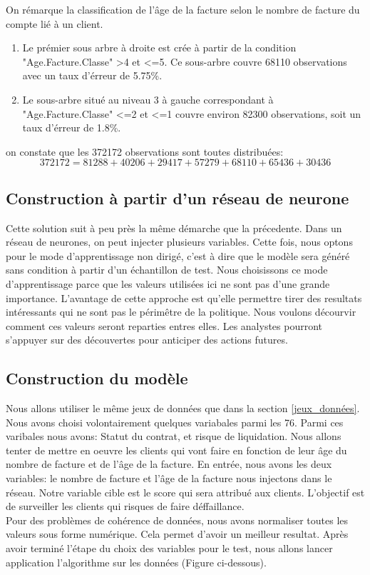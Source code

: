 \documentclass[11pt,a4paper]{report}
\begin{document}
\newpage
On rémarque la classification de l'âge de la facture selon le nombre de facture du compte lié à un client. 
\begin{enumerate}
\item Le prémier sous arbre  à droite est crée à partir de la condition "Age.Facture.Classe" >4 et <=5. Ce sous-arbre couvre 68110 observations avec un taux d'érreur de 5.75\%.

\item Le sous-arbre situé au niveau 3 à gauche correspondant à "Age.Facture.Classe" <=2 et <=1 couvre environ 82300 observations, soit un taux d'érreur de 1.8\%.
\end{enumerate}

on constate que les 372172 observations sont toutes distribuées:
\begin{equation}
          372172=81288+40206+29417+57279+68110+65436+30436
\end{equation}

\newpage
\subsection{Construction à partir d'un réseau de neurone}
Cette solution suit à peu près la même démarche que la précedente. Dans un réseau de neurones, on peut injecter plusieurs variables. Cette fois, nous optons pour le mode d'apprentissage non dirigé, c'est à dire que le modèle sera généré sans condition à partir d'un échantillon de test. Nous choisissons ce mode d'apprentissage parce que les valeurs utilisées ici ne sont pas d'une grande importance. L'avantage de cette approche est qu'elle permettre tirer des resultats intéressants qui ne sont pas le périmêtre de la politique. Nous voulons décourvir comment ces valeurs seront reparties entres elles. Les analystes pourront s'appuyer sur des découvertes pour anticiper des actions futures.     
 
\subsection{Construction du modèle} \label{page}
Nous allons utiliser le même jeux de données que dans la section \ref{jeux_données}. Nous avons choisi volontairement quelques variabales parmi les 76. Parmi ces varibales nous avons: Statut du contrat, et risque de liquidation. Nous allons tenter de mettre en oeuvre les clients qui vont faire en fonction de leur âge du nombre de facture et de l'âge de la facture. 
En entrée, nous avons les deux variables: le nombre de facture et l'âge de la facture nous injectons dans le réseau. Notre variable cible est le score qui sera attribué aux clients. L'objectif est de surveiller les clients qui risques de faire déffaillance.\\
Pour des problèmes de cohérence de données, nous avons normaliser toutes les valeurs sous forme numérique. Cela permet d'avoir un meilleur resultat.   
Après avoir terminé l'étape du choix des variables pour le test, nous allons lancer application l'algorithme sur les données (Figure ci-dessous).
\newpage
\end{document}
